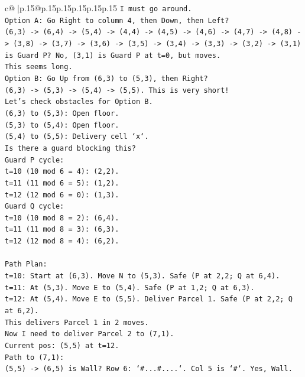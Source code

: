 \documentclass{article}
\begin{document}
{\begin{supertabular}{c@{$\;$}|p{.15\linewidth}@{}p{.15\linewidth}p{.15\linewidth}p{.15\linewidth}p{.15\linewidth}p{.15\linewidth}}
{{{\texttt{I must go around.} \\
\texttt{Option A: Go Right to column 4, then Down, then Left?} \\
\texttt{(6,3) {-}> (6,4) {-}> (5,4) {-}> (4,4) {-}> (4,5) {-}> (4,6) {-}> (4,7) {-}> (4,8) {-}> (3,8) {-}> (3,7) {-}> (3,6) {-}> (3,5) {-}> (3,4) {-}> (3,3) {-}> (3,2) {-}> (3,1) is Guard P? No, (3,1) is Guard P at t=0, but moves.} \\
\texttt{This seems long.} \\
\texttt{Option B: Go Up from (6,3) to (5,3), then Right?} \\
\texttt{(6,3) {-}> (5,3) {-}> (5,4) {-}> (5,5). This is very short!} \\
\texttt{Let's check obstacles for Option B.} \\
\texttt{(6,3) to (5,3): Open floor.} \\
\texttt{(5,3) to (5,4): Open floor.} \\
\texttt{(5,4) to (5,5): Delivery cell `x`.} \\
\texttt{Is there a guard blocking this?} \\
\texttt{Guard P cycle:} \\
\texttt{t=10 (10 mod 6 = 4): (2,2).} \\
\texttt{t=11 (11 mod 6 = 5): (1,2).} \\
\texttt{t=12 (12 mod 6 = 0): (1,3).} \\
\texttt{Guard Q cycle:} \\
\texttt{t=10 (10 mod 8 = 2): (6,4).} \\
\texttt{t=11 (11 mod 8 = 3): (6,3).} \\
\texttt{t=12 (12 mod 8 = 4): (6,2).} \\
\\ 
\texttt{Path Plan:} \\
\texttt{t=10: Start at (6,3). Move N to (5,3). Safe (P at 2,2; Q at 6,4).} \\
\texttt{t=11: At (5,3). Move E to (5,4). Safe (P at 1,2; Q at 6,3).} \\
\texttt{t=12: At (5,4). Move E to (5,5). Deliver Parcel 1. Safe (P at 2,2; Q at 6,2).} \\
\texttt{This delivers Parcel 1 in 2 moves.} \\
\texttt{Now I need to deliver Parcel 2 to (7,1).} \\
\texttt{Current pos: (5,5) at t=12.} \\
\texttt{Path to (7,1):} \\
\texttt{(5,5) {-}> (6,5) is Wall? Row 6: `\#...\#....`. Col 5 is `\#`. Yes, Wall.} \\
}}}
\end{supertabular}}
\end{document}
